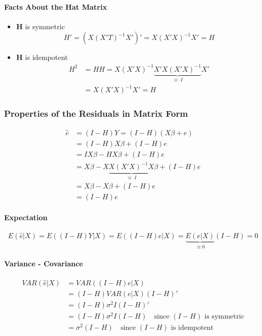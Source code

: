 \documentclass[11pt]{article}
\begin{document}
\paragraph{Facts About the Hat Matrix}
\begin{itemize}
    \item $\mathbf{H}$ is symmetric
        \begin{equation*}
            H' = (X(X'T)^{-1}X')' = X(X'X)^{-1}X' = H
        \end{equation*}
    \item $\mathbf{H}$ is idempotent
        \begin{align*}
            H^2 &= HH =  X(X'X)^{-1} \underbrace{X' X(X'X)^{-1}}_{\equiv ~I}X' \\
            &=  X(X'X)^{-1}X' = H
        \end{align*}
\end{itemize}

\subsubsection{Properties of the Residuals in Matrix Form}
\begin{align*}
    \hat{e} &= (I - H)Y = (I - H)(X\beta + e) \\
    &= (I - H)X\beta + (I - H)e \\
    &= IX\beta - HX\beta + (I - H)e \\
    &= X\beta - X\underbrace{X(X'X)^{-1}X}_{\equiv ~I} \beta + (I - H)e \\
    &= X\beta - X\beta + (I - H)e \\
    &= (I - H)e
\end{align*}
\paragraph{Expectation}
\begin{equation*}
    E(\hat{e}| X) = E((I - H)Y | X) = E((I - H)e | X) = \underbrace{E(e|X)}_{\equiv 0}(I - H) = 0
\end{equation*}

\paragraph{Variance - Covariance}
\begin{align*}
    VAR(\hat{e}|X) &= VAR((I-H)e|X) \\
    &= (I - H) VAR(e|X) (I - H)' \\
    &= (I - H) \sigma^2 I (I - H) '\\
    &= (I - H) \sigma^2 I (I - H) \quad \text{since $(I - H)$ is symmetric} \\
    &= \sigma^2 (I - H) \quad \text{since $(I - H)$ is idempotent}
\end{align*}
\end{document}

